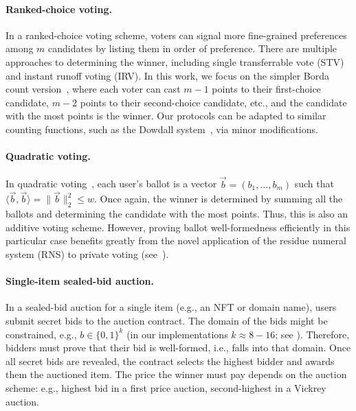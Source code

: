 \paragraph{Ranked-choice voting.} 
In a ranked-choice voting scheme, voters can signal more fine-grained preferences among $m$ candidates by listing them in order of preference. There are multiple approaches to determining the winner, including single transferrable vote (STV) and instant runoff voting (IRV). In this work, we focus on the simpler Borda count version~\cite{Emerson13}, where each voter can cast $m-1$ points to their first-choice candidate, $m-2$ points to their second-choice candidate, etc., and the candidate with the most points is the winner. Our protocols can be adapted to similar counting functions, such as the Dowdall system~\cite{FraGro14}, via minor modifications.

\paragraph{Quadratic voting.} 
In quadratic voting~\cite{LalWey18}, each user's ballot is a vector $\vec{b} = (b_1, \dots, b_m)$ such that $\langle \vec{b}, \vec{b} \rangle = \lVert \vec{b} \rVert^2_2 \leq w$. Once again, the winner is determined by summing all the ballots and determining the candidate with the most points. Thus, this is also an additive voting scheme. 
However, proving ballot well-formedness efficiently in this particular case benefits greatly from the novel application of the residue numeral system (RNS) to private voting (see~).

\paragraph{Single-item sealed-bid auction.} 
In a sealed-bid auction for a single item (e.g., an NFT or domain name), users submit secret bids to the auction contract. The domain of the bids might be constrained, e.g., $b\in\{0,1\}^{k}$ (in our implementations $k\approx 8-16$; see ). Therefore, bidders must prove that their bid is well-formed, i.e., falls into that domain. Once all secret bids are revealed, the contract selects the highest bidder and awards them the auctioned item. The price the winner must pay depends on the auction scheme: e.g., highest bid in a first price auction, second-highest in a Vickrey auction. %

